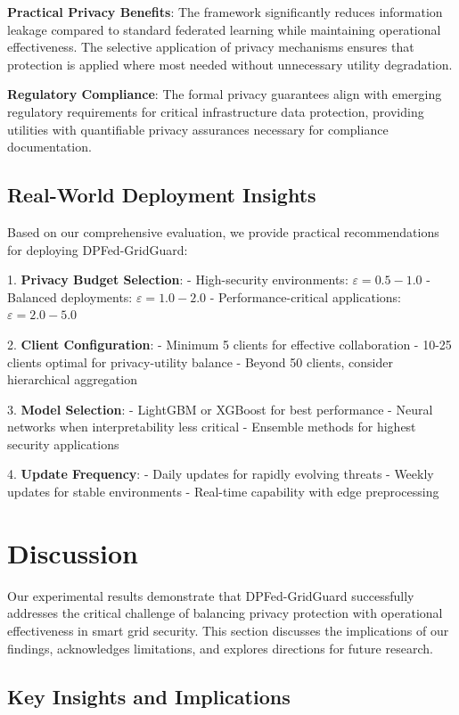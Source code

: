 \documentclass{ieeeaccess}
\theoremstyle{definition}
\begin{document}
\textbf{Practical Privacy Benefits}: The framework significantly reduces information leakage compared to standard federated learning while maintaining operational effectiveness. The selective application of privacy mechanisms ensures that protection is applied where most needed without unnecessary utility degradation.

\textbf{Regulatory Compliance}: The formal privacy guarantees align with emerging regulatory requirements for critical infrastructure data protection, providing utilities with quantifiable privacy assurances necessary for compliance documentation.

\subsection{Real-World Deployment Insights}

Based on our comprehensive evaluation, we provide practical recommendations for deploying DPFed-GridGuard:

1. \textbf{Privacy Budget Selection}:
   - High-security environments: $\varepsilon = 0.5-1.0$
   - Balanced deployments: $\varepsilon = 1.0-2.0$
   - Performance-critical applications: $\varepsilon = 2.0-5.0$

2. \textbf{Client Configuration}:
   - Minimum 5 clients for effective collaboration
   - 10-25 clients optimal for privacy-utility balance
   - Beyond 50 clients, consider hierarchical aggregation

3. \textbf{Model Selection}:
   - LightGBM or XGBoost for best performance
   - Neural networks when interpretability less critical
   - Ensemble methods for highest security applications

4. \textbf{Update Frequency}:
   - Daily updates for rapidly evolving threats
   - Weekly updates for stable environments
   - Real-time capability with edge preprocessing

\section{Discussion}
\label{sec:discussion}

Our experimental results demonstrate that DPFed-GridGuard successfully addresses the critical challenge of balancing privacy protection with operational effectiveness in smart grid security. This section discusses the implications of our findings, acknowledges limitations, and explores directions for future research.

\subsection{Key Insights and Implications}
\end{document}
